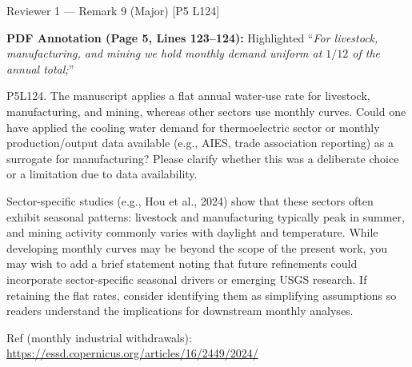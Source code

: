 \documentclass[11pt,letterpaper]{article}
\newcommand{\hlquote}[1]{``\textit{#1}''}
\begin{document}
\begin{commentbox}[label={r1:rem9}]{Reviewer 1 --- Remark 9 (Major) [P5 L124]}
\begin{annotcontext}
\textbf{PDF Annotation (Page 5, Lines 123--124):} Highlighted \hlquote{For livestock, manufacturing, and mining we hold monthly demand uniform at $1/12$ of the annual total;}
\end{annotcontext}
P5L124. The manuscript applies a flat annual water-use rate for livestock, manufacturing, and mining, whereas other sectors use monthly curves. Could one have applied the cooling water demand for thermoelectric sector or monthly production/output data available (e.g., AIES, trade association reporting) as a surrogate for manufacturing? Please clarify whether this was a deliberate choice or a limitation due to data availability.

Sector-specific studies (e.g., Hou et al., 2024) show that these sectors often exhibit seasonal patterns: livestock and manufacturing typically peak in summer, and mining activity commonly varies with daylight and temperature. While developing monthly curves may be beyond the scope of the present work, you may wish to add a brief statement noting that future refinements could incorporate sector-specific seasonal drivers or emerging USGS research. If retaining the flat rates, consider identifying them as simplifying assumptions so readers understand the implications for downstream monthly analyses.

Ref (monthly industrial withdrawals): \url{https://essd.copernicus.org/articles/16/2449/2024/}
\end{commentbox}
\end{document}

